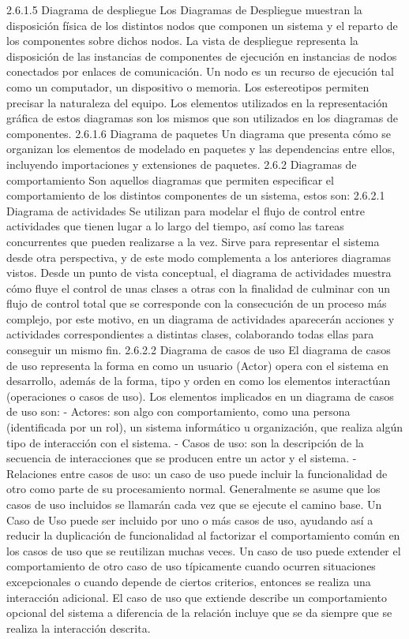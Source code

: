 2.6.1.5	Diagrama de despliegue 
Los Diagramas de Despliegue muestran la disposición física de los distintos nodos que componen un sistema y el reparto de los componentes sobre dichos nodos. La vista de despliegue representa la disposición de las instancias de componentes de ejecución en instancias de nodos conectados por enlaces de comunicación. Un nodo es un recurso de ejecución tal como un computador, un dispositivo o memoria. Los estereotipos permiten precisar la naturaleza del equipo.  Los elementos utilizados en la representación gráfica de estos diagramas son los mismos que son utilizados en los diagramas de componentes.
2.6.1.6	Diagrama de paquetes 
Un diagrama que presenta cómo se organizan los elementos de modelado en paquetes y las dependencias entre ellos, incluyendo importaciones y extensiones de paquetes.
2.6.2	Diagramas de comportamiento
Son aquellos diagramas que permiten especificar el comportamiento de los distintos componentes de un sistema, estos son:
2.6.2.1	Diagrama de actividades 
Se utilizan para modelar el flujo de control entre actividades que tienen lugar a lo largo del tiempo, así como las tareas concurrentes que pueden realizarse a la vez. Sirve para representar el sistema desde otra perspectiva, y de este modo complementa a los anteriores diagramas vistos. Desde un punto de vista conceptual, el diagrama de actividades muestra cómo fluye el control de unas clases a otras con la finalidad de culminar con un flujo de control total que se corresponde con la consecución de un proceso más complejo, por este motivo, en un diagrama de actividades aparecerán acciones y actividades correspondientes a distintas clases, colaborando todas ellas para conseguir un mismo fin.
2.6.2.2	Diagrama de casos de uso 
El diagrama de casos de uso representa la forma en como un usuario (Actor) opera con el sistema en desarrollo, además de la forma, tipo y orden en como los elementos interactúan (operaciones o casos de uso).
Los elementos implicados en un diagrama de casos de uso son:
-	Actores: son algo con comportamiento, como una persona (identificada por un rol), un sistema informático u organización, que realiza algún tipo de interacción con el sistema. 
-	Casos de uso: son la descripción de la secuencia de interacciones que se producen entre un actor y el sistema. 
-	Relaciones entre casos de uso: un caso de uso puede incluir la funcionalidad de otro como parte de su procesamiento normal. Generalmente se asume que los casos de uso incluidos se llamarán cada vez que se ejecute el camino base. Un Caso de Uso puede ser incluido por uno o más casos de uso, ayudando así a reducir la duplicación de funcionalidad al factorizar el comportamiento común en los casos de uso que se reutilizan muchas veces. Un caso de uso puede extender el comportamiento de otro caso de uso típicamente cuando ocurren situaciones excepcionales o cuando depende de ciertos criterios, entonces se realiza una interacción adicional. El caso de uso que extiende describe un comportamiento opcional del sistema a diferencia de la relación  incluye que se da siempre que se realiza la interacción descrita.
